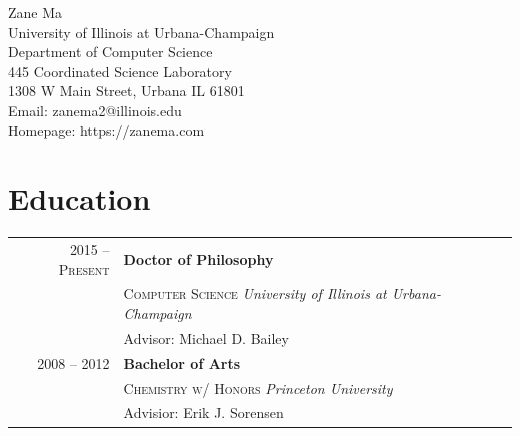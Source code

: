 \documentclass[10pt,singlecolumn]{article} %
\begin{document}
\color{text1} %


{\Huge Zane Ma} \vspace{0.5cm}\\ %
University of Illinois at Urbana-Champaign \\
Department of Computer Science \\
445 Coordinated Science Laboratory \\
1308 W Main Street, Urbana IL 61801 \\
Email: zanema2@illinois.edu \\ 
Homepage: https://zanema.com \\ 


\section{Education} 

\begin{tabular}{rl} %


2015 -- \textsc{Present} & \textbf{Doctor of Philosophy} \\ 
& \textsc{Computer Science}  \textit{University of Illinois at Urbana-Champaign}\\ 
& Advisor: Michael D. Bailey \\
	 

2008 -- 2012 & \textbf{Bachelor of Arts} \\ 
& \textsc{Chemistry w/ Honors}  \textit{Princeton University}\\
& Advisior: Erik J. Sorensen \\
	  
\end{tabular} \\
\end{document}
